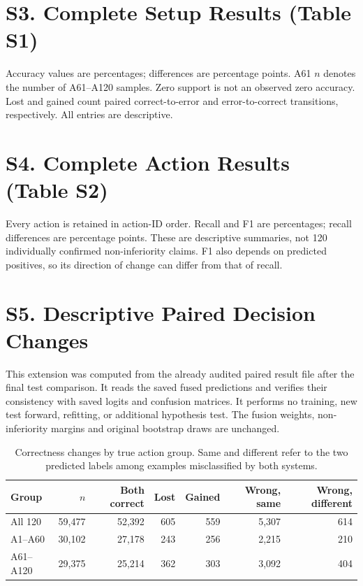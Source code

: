 \documentclass[10pt,a4paper]{article}
\begin{document}
\section*{S3. Complete Setup Results (Table S1)}
Accuracy values are percentages; differences are percentage points. A61 $n$ denotes the number of A61--A120 samples. Zero support is not an observed zero accuracy. Lost and gained count paired correct-to-error and error-to-correct transitions, respectively. All entries are descriptive.
\begin{center}\small\setlength{\tabcolsep}{4pt}\end{center}
\section*{S4. Complete Action Results (Table S2)}
Every action is retained in action-ID order. Recall and F1 are percentages; recall differences are percentage points. These are descriptive summaries, not 120 individually confirmed non-inferiority claims. F1 also depends on predicted positives, so its direction of change can differ from that of recall.
\begin{center}\small\setlength{\tabcolsep}{4pt}\end{center}
\clearpage
\section*{S5. Descriptive Paired Decision Changes}
This extension was computed from the already audited paired result file after the final test comparison. It reads the saved fused predictions and verifies their consistency with saved logits and confusion matrices. It performs no training, new test forward, refitting, or additional hypothesis test. The fusion weights, non-inferiority margins and original bootstrap draws are unchanged.

\begin{table}[h]\centering\small
\caption{Correctness changes by true action group. Same and different refer to the two predicted labels among examples misclassified by both systems.}
\begin{tabular}{lrrrrrr}
\toprule
Group & $n$ & Both correct & Lost & Gained & Wrong, same & Wrong, different\\
\midrule
All 120 & 59,477 & 52,392 & 605 & 559 & 5,307 & 614 \\
A1--A60 & 30,102 & 27,178 & 243 & 256 & 2,215 & 210 \\
A61--A120 & 29,375 & 25,214 & 362 & 303 & 3,092 & 404 \\
\bottomrule
\end{tabular}
\end{table}
\end{document}
